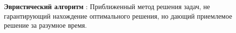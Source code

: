 \textbf{Эвристический алгоритм} : Приближенный метод решения задач, не гарантирующий нахождение оптимального решения, но дающий приемлемое решение за разумное время.
